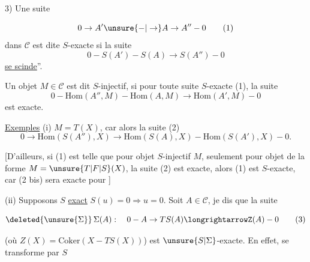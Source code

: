 3) Une suite

\[
0\to A'\unsure{-|\to} A\to A''-0 \tag*{(1)}
\]
dans $\mathcal C$ est dite $S$-exacte si la suite
\[
0-S(A')-S(A)\to S(A'')-0 \tag*{(1 bis)}
\]
  \uline{se scinde}''.

Un objet $M\in\mathcal C$ est dit $S$-injectif, si pour toute suite $S$-exacte (1), la suite
\[
0-\mathrm{Hom}(A'',M)-\mathrm{Hom}(A,M)\longrightarrow\mathrm{Hom}(A',M)-0 \tag*{(2)}
\]
est exacte.

\uline{Exemples} (i) $M=T(X)$, car alors la suite (2) 
\[
0\to\mathrm{Hom}(S(A''),X)\to\mathrm{Hom}(S(A),X)-\mathrm{Hom}(S(A'),X)-0. \tag*{(2 bis)}
\]

[D'ailleurs, si (1) est telle que pour  objet $S$-injectif $M$,    seulement pour  objet de la forme $M=\unsure{T|F|S}(X)$,  la suite (2) est exacte, alors (1) est $S$-exacte, car  (2 bis) sera exacte pour  ]


(ii) Supposons $S$ \uline{exact}   $S(u)=0\Longrightarrow u=0$. Soit $A\in\mathcal C$, je dis que la suite

\[
\deleted{\unsure{\Sigma}}\,\Sigma(A):\quad 0-A\to TS(A)\longrightarrowZ(A)-0 \tag*{(3)}
\]

(où $Z(X)=\mathrm{Coker}(X-TS(X))$) est $\unsure{S|\Sigma}$-exacte. En effet,  se transforme par $S$

